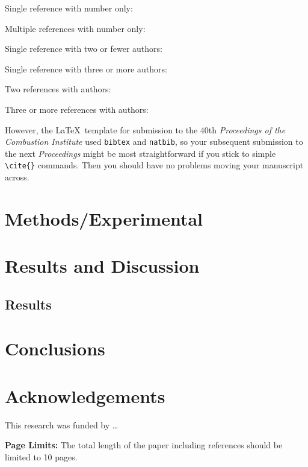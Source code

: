 \documentclass[12pt]{ussci}
\begin{document}
Single reference with number only: \cite{Zhao2013}

Multiple references with number only: \cite{Affleck1967,Turanyi2014,cantera}

Single reference with two or fewer authors: \textcite{Affleck1967}

Single reference with three or more authors: \textcite{Wang2011}

Two references with authors: \textcite{Kee1996,Baumgardner2013}

Three or more references with authors: \textcite{Kee1996,Baumgardner2013,Haworth2011}

However, the \LaTeX\ template for submission to the 40th {\em Proceedings of the Combustion Institute} used {\tt bibtex} and {\tt natbib}, so your subsequent submission to the next {\em Proceedings} might be most straightforward if you stick to simple \verb|\cite{}| commands. Then you should have no problems moving your manuscript across.

\section{Methods/Experimental}
%
\blindtext


\section{Results and Discussion}
%
\blindtext

\subsection{Results}
%
\blindtext

\section{Conclusions}
%
\blindtext

\blindtext

\section{Acknowledgements}
This research was funded by \ldots

\noindent\textbf{Page Limits:} The total length of the paper including references should be limited to 10 pages.

\printbibliography
\end{document}
